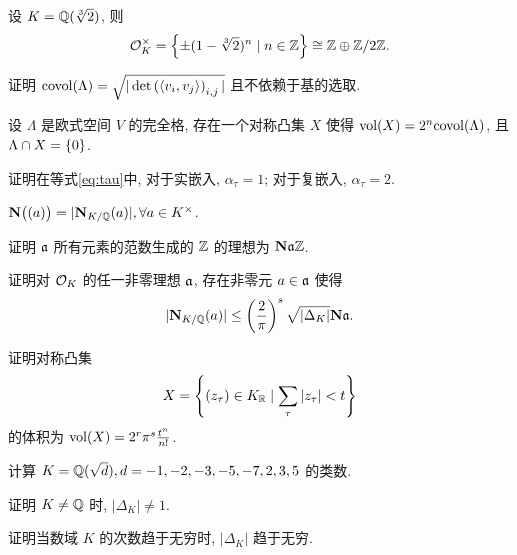 \begin{example}
设 $K={\mathbb{Q}}(\sqrt[3]{2})$, 则
	\[{\mathcal{O}}_K^\times=\left\{\pm(1-\sqrt[3]{2})^n\mid n\in{\mathbb{Z}}\right\}\cong {\mathbb{Z}}\oplus {\mathbb{Z}}/2{\mathbb{Z}}.\]
\end{example}

\begin{exercise}
证明 ${\mathrm{covol}}(\Lambda)=\sqrt{|\det\left(\langle{v_i,v_j}\rangle\right)_{i,j}|}$ 且不依赖于基的选取.
\end{exercise}
	
\begin{exercise}
设 $\Lambda$ 是欧式空间 $V$ 的完全格, 存在一个对称凸集 $X$ 使得 ${\mathrm{vol}}(X)=2^n{\mathrm{covol}}(\Lambda)$, 且 $\Lambda\cap X=\left\{0\right\}$.
\end{exercise}

\begin{exercise}
证明在等式\eqref{eq:tau}中, 对于实嵌入, $\alpha_\tau=1$; 对于复嵌入, $\alpha_\tau=2$.
\end{exercise}

\begin{exercise}
${\mathbf{N}}\bigl((a)\bigr)=|{\mathbf{N}}_{K/{\mathbb{Q}}}(a)|,\forall a\in K^\times$.
\end{exercise}

\begin{exercise}
证明 ${\mathfrak{a}}$ 所有元素的范数生成的 ${\mathbb{Z}}$ 的理想为 ${\mathbf{N}}{\mathfrak{a}} {\mathbb{Z}}$.
\end{exercise}

\begin{exercise}\label{exe:weak_bound}
证明对 ${\mathcal{O}}_K$ 的任一非零理想 ${\mathfrak{a}}$, 存在非零元 $a\in{\mathfrak{a}}$ 使得
	\[|{\mathbf{N}}_{K/{\mathbb{Q}}}(a)|\le \left(\frac{2}{\pi}\right)^s\sqrt{|\Delta_K|}{\mathbf{N}}{\mathfrak{a}}.\]
\end{exercise}

\begin{exercise}
证明对称凸集
	\[X=\left\{(z_\tau)\in K_{\mathbb{R}}\mid \sum\limits_\tau |z_\tau|<t\right\}\]
的体积为 ${\mathrm{vol}}(X)=2^r\pi^s \frac{t^n}{n!}$.
\end{exercise}

\begin{exercise}
计算 $K={\mathbb{Q}}(\sqrt{d}),d=-1,-2,-3,-5,-7,2,3,5$ 的类数.
\end{exercise}

\begin{exercise}\label{exe:disc_not_pm1}
证明 $K\ne {\mathbb{Q}}$ 时, $|\Delta_K|\neq 1$.
\end{exercise}

\begin{exercise}
证明当数域 $K$ 的次数趋于无穷时, $|\Delta_K|$ 趋于无穷.
\end{exercise}


